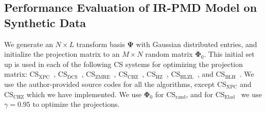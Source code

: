 \subsection{Performance Evaluation of IR-PMD Model on Synthetic Data}
%
We generate an $N \times L$ transform basis $\bm{\Psi}$ with Gaussian distributed entries, and initialize the projection matrix to an $M \times N$ random matrix $\bm{\Phi}_{0}$. This initial set up is used in each of the following CS systems for optimizing the projection matrix: $\text{CS}_{\text{XPC}}$~\cite{Xuprojection}, $\text{CS}_{\text{DCS}}$~\cite{Sapiro}, $\text{CS}_{\text{ZMRE}}$~\cite{Zelnik}, $\text{CS}_{\text{CHZ}}$~\cite{CHZ}, $\text{CS}_{\text{HZ}}$~\cite{HONG_robust}, $\text{CS}_{\text{HLZL}}$~\cite{HONG_sparse}, and  $\text{CS}_{\text{BLH}}$~\cite{SRE_Huang}. We use the author-provided source codes for all the algorithms, except $\text{CS}_\text{XPC}$ and $\text{CS}_{\text{CHZ}}$ which we have implemented. We use $\bm{\Phi}_{0}$ for $\text{CS}_{\text{rand}}$, and for $\text{CS}_{\text{Elad}}$~\cite{Elad} we use $\gamma=0.95$ to optimize the projections. 

